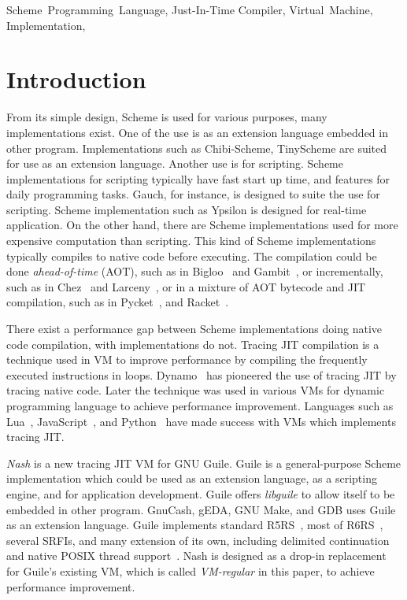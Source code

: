 \documentclass[preprint, 10pt]{sigplanconf}
\begin{document}

\keywords{} Scheme~Programming~Language, Just-In-Time Compiler, Virtual~Machine,
Implementation,

\section{Introduction}

From its simple design, Scheme is used for various purposes, many
implementations exist. One of the use is as an extension language embedded in
other program. Implementations such as Chibi-Scheme, TinyScheme are suited for
use as an extension language. Another use is for scripting. Scheme
implementations for scripting typically have fast start up time, and features
for daily programming tasks. Gauch, for instance, is designed to suite the use
for scripting. Scheme implementation such as Ypsilon is designed for real-time
application. On the other hand, there are Scheme implementations used for more
expensive computation than scripting. This kind of Scheme implementations
typically compiles to native code before executing. The compilation could be
done \textit{ahead-of-time} (AOT), such as in Bigloo~\cite{serrano1995bigloo}
and Gambit~\cite{feeley1998gambit}, or incrementally, such as in
Chez~\cite{dybvig2006development} and Larceny~\cite{hansen1992impact}, or in a
mixture of AOT bytecode and JIT compilation, such as in
Pycket~\cite{bauman2015pycket}, and Racket~\cite{flatt2013racket}.

There exist a performance gap between Scheme implementations doing native code
compilation, with implementations do not. Tracing JIT compilation is a
technique used in VM to improve performance by compiling the frequently
executed instructions in loops. Dynamo~\cite{bala2000dynamo} has pioneered the
use of tracing JIT by tracing native code. Later the technique was used in
various VMs for dynamic programming language to achieve performance
improvement. Languages such as Lua~\cite{pall2016luajit},
JavaScript~\cite{gal2009trace}, and Python~\cite{bolz2009tracing} have made
success with VMs which implements tracing JIT.\@

\textit{Nash} is a new tracing JIT VM for GNU Guile. Guile is a
general-purpose Scheme implementation which could be used as an extension
language, as a scripting engine, and for application development. Guile offers
\textit{libguile} to allow itself to be embedded in other program. GnuCash,
gEDA, GNU Make, and GDB uses Guile as an extension language. Guile implements
standard R5RS~\cite{abelson1998revised5}, most of
R6RS~\cite{sperber2010revised}, several SRFIs, and many extension of its own,
including delimited continuation and native POSIX thread
support~\cite{Galassi02guilereference}. Nash is designed as a drop-in
replacement for Guile's existing VM, which is called \textit{VM-regular} in
this paper, to achieve performance improvement.
\end{document}
